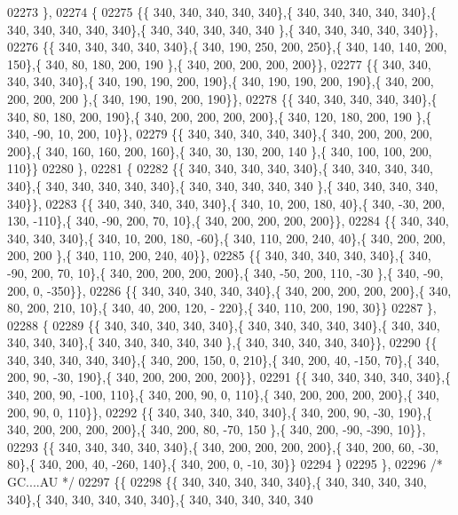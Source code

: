 \begin{DoxyCode}
02273 \},
02274 \{
02275 \{\{ 340, 340, 340, 340, 340\},\{ 340, 340, 340, 340, 340\},\{ 340, 340, 340, 340, 340\},\{ 340, 340, 340, 340, 340
      \},\{ 340, 340, 340, 340, 340\}\},
02276 \{\{ 340, 340, 340, 340, 340\},\{ 340, 190, 250, 200, 250\},\{ 340, 140, 140, 200, 150\},\{ 340,  80, 180, 200, 190
      \},\{ 340, 200, 200, 200, 200\}\},
02277 \{\{ 340, 340, 340, 340, 340\},\{ 340, 190, 190, 200, 190\},\{ 340, 190, 190, 200, 190\},\{ 340, 200, 200, 200, 200
      \},\{ 340, 190, 190, 200, 190\}\},
02278 \{\{ 340, 340, 340, 340, 340\},\{ 340,  80, 180, 200, 190\},\{ 340, 200, 200, 200, 200\},\{ 340, 120, 180, 200, 190
      \},\{ 340, -90,  10, 200,  10\}\},
02279 \{\{ 340, 340, 340, 340, 340\},\{ 340, 200, 200, 200, 200\},\{ 340, 160, 160, 200, 160\},\{ 340,  30, 130, 200, 140
      \},\{ 340, 100, 100, 200, 110\}\}
02280 \},
02281 \{
02282 \{\{ 340, 340, 340, 340, 340\},\{ 340, 340, 340, 340, 340\},\{ 340, 340, 340, 340, 340\},\{ 340, 340, 340, 340, 340
      \},\{ 340, 340, 340, 340, 340\}\},
02283 \{\{ 340, 340, 340, 340, 340\},\{ 340,  10, 200, 180,  40\},\{ 340, -30, 200, 130, -110\},\{ 340, -90, 200,  70,  
      10\},\{ 340, 200, 200, 200, 200\}\},
02284 \{\{ 340, 340, 340, 340, 340\},\{ 340,  10, 200, 180, -60\},\{ 340, 110, 200, 240,  40\},\{ 340, 200, 200, 200, 200
      \},\{ 340, 110, 200, 240,  40\}\},
02285 \{\{ 340, 340, 340, 340, 340\},\{ 340, -90, 200,  70,  10\},\{ 340, 200, 200, 200, 200\},\{ 340, -50, 200, 110, -30
      \},\{ 340, -90, 200,   0, -350\}\},
02286 \{\{ 340, 340, 340, 340, 340\},\{ 340, 200, 200, 200, 200\},\{ 340,  80, 200, 210,  10\},\{ 340,  40, 200, 120, -
      220\},\{ 340, 110, 200, 190,  30\}\}
02287 \},
02288 \{
02289 \{\{ 340, 340, 340, 340, 340\},\{ 340, 340, 340, 340, 340\},\{ 340, 340, 340, 340, 340\},\{ 340, 340, 340, 340, 340
      \},\{ 340, 340, 340, 340, 340\}\},
02290 \{\{ 340, 340, 340, 340, 340\},\{ 340, 200, 150,   0, 210\},\{ 340, 200,  40, -150,  70\},\{ 340, 200,  90, -30, 
      190\},\{ 340, 200, 200, 200, 200\}\},
02291 \{\{ 340, 340, 340, 340, 340\},\{ 340, 200,  90, -100, 110\},\{ 340, 200,  90,   0, 110\},\{ 340, 200, 200, 200, 
      200\},\{ 340, 200,  90,   0, 110\}\},
02292 \{\{ 340, 340, 340, 340, 340\},\{ 340, 200,  90, -30, 190\},\{ 340, 200, 200, 200, 200\},\{ 340, 200,  80, -70, 150
      \},\{ 340, 200, -90, -390,  10\}\},
02293 \{\{ 340, 340, 340, 340, 340\},\{ 340, 200, 200, 200, 200\},\{ 340, 200,  60, -30,  80\},\{ 340, 200,  40, -260, 
      140\},\{ 340, 200,   0, -10,  30\}\}
02294 \}
02295 \},
02296 \textcolor{comment}{/* GC....AU */}
02297 \{\{
02298 \{\{ 340, 340, 340, 340, 340\},\{ 340, 340, 340, 340, 340\},\{ 340, 340, 340, 340, 340\},\{ 340, 340, 340, 340, 340

\end{DoxyCode}
